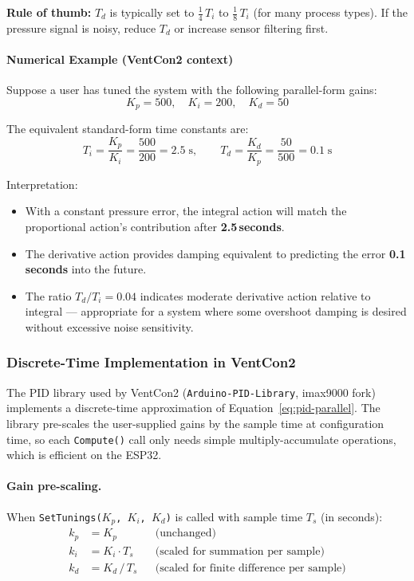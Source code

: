 \noindent
\textbf{Rule of thumb:} $T_d$ is typically set to $\frac{1}{4}\,T_i$ to $\frac{1}{8}\,T_i$ (for many process types). If the pressure signal is noisy, reduce $T_d$ or increase sensor filtering first.

\paragraph{Numerical Example (VentCon2 context)}

Suppose a user has tuned the system with the following parallel-form gains:
\[
K_p = 500, \quad K_i = 200, \quad K_d = 50
\]

The equivalent standard-form time constants are:
\[
T_i = \frac{K_p}{K_i} = \frac{500}{200} = 2.5\;\text{s}, \qquad
T_d = \frac{K_d}{K_p} = \frac{50}{500} = 0.1\;\text{s}
\]

\noindent
Interpretation:
\begin{itemize}
    \item With a constant pressure error, the integral action will match the proportional action's contribution after \textbf{2.5\,seconds}.
    \item The derivative action provides damping equivalent to predicting the error \textbf{0.1\,seconds} into the future.
    \item The ratio $T_d / T_i = 0.04$ indicates moderate derivative action relative to integral --- appropriate for a system where some overshoot damping is desired without excessive noise sensitivity.
\end{itemize}


\subsubsection{Discrete-Time Implementation in VentCon2}
\label{sec:pid-discrete}

The PID library used by VentCon2 (\texttt{Arduino-PID-Library}, imax9000 fork) implements a discrete-time approximation of Equation~\ref{eq:pid-parallel}. The library pre-scales the user-supplied gains by the sample time at configuration time, so each \texttt{Compute()} call only needs simple multiply-accumulate operations, which is efficient on the ESP32.

\paragraph{Gain pre-scaling.}
When \texttt{SetTunings($K_p$, $K_i$, $K_d$)} is called with sample time $T_s$ (in seconds):
\begin{align}
    k_p &= K_p               & &\text{(unchanged)} \label{eq:kp-internal} \\
    k_i &= K_i \cdot T_s     & &\text{(scaled for summation per sample)} \label{eq:ki-internal} \\
    k_d &= K_d \,/\, T_s     & &\text{(scaled for finite difference per sample)} \label{eq:kd-internal}
\end{align}

